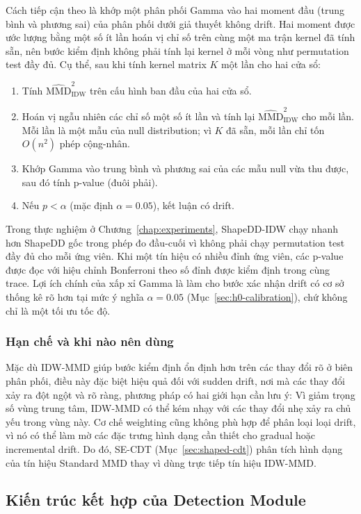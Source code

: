 Cách tiếp cận theo \cite{gretton2009gamma} là khớp một phân phối Gamma vào hai moment đầu (trung bình và phương sai) của phân phối dưới giả thuyết không drift. Hai moment được ước lượng bằng một số ít lần hoán vị chỉ số trên cùng một ma trận kernel đã tính sẵn, nên bước kiểm định không phải tính lại kernel ở mỗi vòng như permutation test đầy đủ. Cụ thể, sau khi tính kernel matrix $K$ một lần cho hai cửa sổ:
\begin{enumerate}
	\item Tính $\widehat{\text{MMD}}^2_{\text{IDW}}$ trên cấu hình ban đầu của hai cửa sổ.
	\item Hoán vị ngẫu nhiên các chỉ số một số ít lần và tính lại $\widehat{\text{MMD}}^2_{\text{IDW}}$ cho mỗi lần. Mỗi lần là một mẫu của null distribution; vì $K$ đã sẵn, mỗi lần chỉ tốn $O(n^2)$ phép cộng-nhân.
	\item Khớp Gamma vào trung bình và phương sai của các mẫu null vừa thu được, sau đó tính p-value (đuôi phải).
	\item Nếu $p < \alpha$ (mặc định $\alpha = 0.05$), kết luận có drift.
\end{enumerate}

Trong thực nghiệm ở Chương~\ref{chap:experiments}, ShapeDD-IDW chạy nhanh hơn ShapeDD gốc trong phép đo đầu-cuối vì không phải chạy permutation test đầy đủ cho mỗi ứng viên. Khi một tín hiệu có nhiều đỉnh ứng viên, các p-value được đọc với hiệu chỉnh Bonferroni theo số đỉnh được kiểm định trong cùng trace. Lợi ích chính của xấp xỉ Gamma là làm cho bước xác nhận drift có cơ sở thống kê rõ hơn tại mức ý nghĩa $\alpha = 0.05$ (Mục~\ref{sec:h0-calibration}), chứ không chỉ là một tối ưu tốc độ.

\subsubsection{Hạn chế và khi nào nên dùng}
Mặc dù IDW-MMD giúp bước kiểm định ổn định hơn trên các thay đổi rõ ở biên phân phối, điều này đặc biệt hiệu quả đối với sudden drift, nơi mà các thay đổi xảy ra đột ngột và rõ ràng, phương pháp có hai giới hạn cần lưu ý:
Vì giảm trọng số vùng trung tâm, IDW-MMD có thể kém nhạy với các thay đổi nhẹ xảy ra chủ yếu trong vùng này. Cơ chế weighting cũng không phù hợp để phân loại loại drift, vì nó có thể làm mờ các đặc trưng hình dạng cần thiết cho gradual hoặc incremental drift. Do đó, SE-CDT (Mục~\ref{sec:shaped-cdt}) phân tích hình dạng của tín hiệu Standard MMD thay vì dùng trực tiếp tín hiệu IDW-MMD.

\subsection{Kiến trúc kết hợp của Detection Module}
\label{sec:detection-hybrid}

